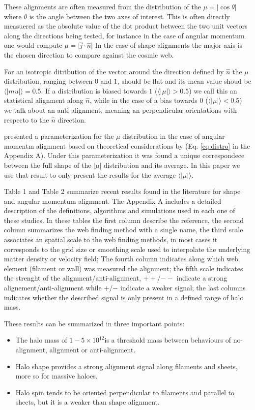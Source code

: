 \documentclass[usenatbib]{mn2e}
\newcommand{\hMsun}{{\ifmmode{h^{-1}{\rm
        {M_{\odot}}}}\else{$h^{-1}{\rm{M_{\odot}}}$}\fi}}
\begin{document}
These alignments are often measured from the distribution of the
$\mu=\vert\cos\theta\vert$ where $\theta$ is the angle between the two axes of
interest. This is often directly measuered as the absolute value of
the dot product between the two unit vectors along the directions
being tested, for instance in the case of angular momentum one would compute
$\mu=\vert\hat{j}\cdot\hat{n}\vert$ In the case of shape alignments the major
axis is the chosen direction to compare against the cosmic web. 

For an isotropic ditribution of the vector around the direction defined by
$\hat{n}$ the $\mu$ distribution, ranging between $0$ and $1$, should
be flat and its mean value shoud be
$\langle|mu|\rangle=0.5$. If a distribution is biased towards $1$
($\langle\vert\mu\vert\rangle>0.5$) we call this an statistical
alignment along $\hat{n}$, while in the case of a bias towards $0$
($\langle\vert\mu\vert\rangle<0.5$) we talk about an anti-alignment,
meaning an perpendicular orientations with respecto to the $\hat{n}$
direction. 

\cite{Trowland2013} presented a parameterization for the $\mu$
distribution in the case of angular momentm alignment based on
theoretical considerations by \cite{Lee2005} (Eq. \ref{eq:distro} in
the Appendix A). Under this parameterization it was found a unique
correspondece between the full shape of the $\vert\mu\vert$
distribution and its average. In this paper we use that result to only
present the results for the average $\langle\vert\mu\vert\rangle$. 

Table 1 and Table 2 summarize recent results found in the literature for
shape and angular momentum alignment. The Appendix A includes a detailed
description of the definitions, algorithms and simulations used in
each one of these studies. In these tables the first column describe
the reference, the second column summarizes the web finding method
with a single name, the third scale associates an spatial scale to the
web finding methods, in most cases it corresponds to the grid size or
smoothing scale used to interpolate the underlying matter density or
velocity field; The fourth column indicates along which web element
(filament or wall) was measured the alignment; the fifth scale
indicates the strenght of the alignment/anti-alignment, $++$/$--$
indicate a strong alignement/anti-alignment while $+$/$-$ indicate a
weaker signal; the last columns indicates whether the described signal
is only present in a defined range of halo mass.

These results can be summarized in three important points:
\begin{itemize}
\item The halo mass of $1-5\times 10^{12}$\hMsun is a threshold mass between
behaviours of no-alignment, alignment or anti-alignment.
\item Halo shape provides a strong alignment signal along filaments
  and sheets, more so for massive haloes. 
\item Halo spin tends to be oriented perpendicular to filaments and
parallel to sheets, but it is a weaker than shape alignment. 
\end{itemize}
\end{document}
